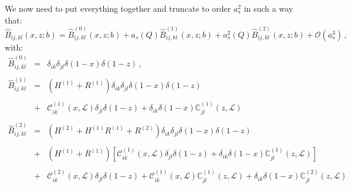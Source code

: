 \documentclass[10pt,a4paper]{article}
\begin{document}
We now need to put everything together and truncate to order $a_s^2$
in such a way that:
\begin{equation}
\hat{B}_{ij,kl}(x,z;b) = \hat{B}_{ij,kl}^{(0)}(x,z;b)+a_s(Q) \hat{B}_{ij,kl}^{(1)}(x,z;b)+a_s^2(Q) \hat{B}_{ij,kl}^{(2)}(x,z;b)+\mathcal{O}(a_s^3) \,,
\end{equation}
with:
\begin{equation}\label{eq:pertcoefb}
\begin{array}{rcl}
  \displaystyle \hat{B}_{ij,kl}^{(0)} &=&\displaystyle
                                          \delta_{ik}\delta_{jl}\delta(1-x)\delta(1-z)\,,\\
  \\
  \displaystyle \hat{B}_{ij,kl}^{(1)} &=&\displaystyle
                                          (H^{(1)}+R^{(1)})\delta_{ik}\delta_{jl}\delta(1-x)\delta(1-z)\\
  \\
                                      &+& \mathcal{C}_{ik}^{(1)}(x,\mathcal{L})\delta_{jl}\delta(1-z) + \delta_{ik}\delta(1-x)\mathbb{C}_{jl}^{(1)}(z,\mathcal{L})\\
  \\
  \displaystyle \hat{B}_{ij,kl}^{(2)} &=& \displaystyle
                                          (H^{(2)}+H^{(1)}R^{(1)}+R^{(2)})
                                          \delta_{ik}\delta_{jl}\delta(1-x)\delta(1-z)\\
  \\
                                      &+&\displaystyle
                                          (H^{(1)}+R^{(1)})\left[\mathcal{C}_{ik}^{(1)}(x,\mathcal{L})\delta_{jl}\delta(1-z)
                                          +
                                          \delta_{ik}\delta(1-x)\mathbb{C}_{jl}^{(1)}(z,\mathcal{L})\right]\\
  \\
                                      &+& \mathcal{C}_{ik}^{(2)}(x,\mathcal{L})\delta_{jl}\delta(1-z) + 
                                          \mathcal{C}_{ik}^{(1)}(x,\mathcal{L})\mathbb{C}_{jl}^{(1)}(z,\mathcal{L})
                                          +\delta_{ik}\delta(1-x)\mathbb{C}_{jl}^{(2)}(z,\mathcal{L})
\end{array}
\end{equation}
\end{document}
